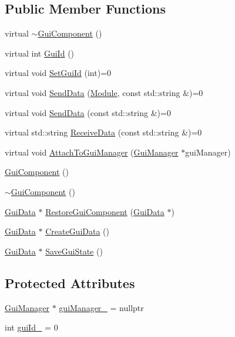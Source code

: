 \subsection*{Public Member Functions}
\begin{DoxyCompactItemize}
\item 
virtual \mbox{\hyperlink{class_gui_component_ad94998891efad935b4422cf1da69e4af}{$\sim$\+Gui\+Component}} ()
\item 
virtual int \mbox{\hyperlink{class_gui_component_a57b8809f4ce6a4e238c5b87c158da99b}{Gui\+Id}} ()
\item 
virtual void \mbox{\hyperlink{class_gui_component_a27d0d28dbc048b7cd3ad63e8a1961021}{Set\+Gui\+Id}} (int)=0
\item 
virtual void \mbox{\hyperlink{class_gui_component_a131dadcfcbe0278cf6c995a64cca871f}{Send\+Data}} (\mbox{\hyperlink{_mediator_2_mediator_2_commons_8h_a88683b64d84542943724ba0f211153af}{Module}}, const std\+::string \&)=0
\item 
virtual void \mbox{\hyperlink{class_gui_component_a50da12b404e7ef1adbebafdabd66884f}{Send\+Data}} (const std\+::string \&)=0
\item 
virtual std\+::string \mbox{\hyperlink{class_gui_component_ad136b2da6c63d7d3147f6cc411696cfe}{Receive\+Data}} (const std\+::string \&)=0
\item 
virtual void \mbox{\hyperlink{class_gui_component_a34ffc6f2ca0ce6f58c9fb6a2fd3e1a32}{Attach\+To\+Gui\+Manager}} (\mbox{\hyperlink{class_gui_manager}{Gui\+Manager}} $\ast$gui\+Manager)
\item 
\mbox{\hyperlink{class_gui_component_a39e1734c781ba4ac8c87da58e0a10ebd}{Gui\+Component}} ()
\item 
\mbox{\hyperlink{class_gui_component_ad94998891efad935b4422cf1da69e4af}{$\sim$\+Gui\+Component}} ()
\item 
\mbox{\hyperlink{class_gui_data}{Gui\+Data}} $\ast$ \mbox{\hyperlink{class_gui_component_a6721cce20f5628d9413784b10a48b359}{Restore\+Gui\+Component}} (\mbox{\hyperlink{class_gui_data}{Gui\+Data}} $\ast$)
\item 
\mbox{\hyperlink{class_gui_data}{Gui\+Data}} $\ast$ \mbox{\hyperlink{class_gui_component_a11b7920b50fe9e10a7f2450a79e03647}{Create\+Gui\+Data}} ()
\item 
\mbox{\hyperlink{class_gui_data}{Gui\+Data}} $\ast$ \mbox{\hyperlink{class_gui_component_af41e8f80eeca9b258649c7579a7e8c5c}{Save\+Gui\+State}} ()
\end{DoxyCompactItemize}
\subsection*{Protected Attributes}
\begin{DoxyCompactItemize}
\item 
\mbox{\hyperlink{class_gui_manager}{Gui\+Manager}} $\ast$ \mbox{\hyperlink{class_gui_component_a96d148edf9f521cd048b98f749bdf2e5}{gui\+Manager\+\_\+}} = nullptr
\item 
int \mbox{\hyperlink{class_gui_component_a8fb428ee8083cdaf7d1f9729a22bcf84}{gui\+Id\+\_\+}} = 0
\end{DoxyCompactItemize}


